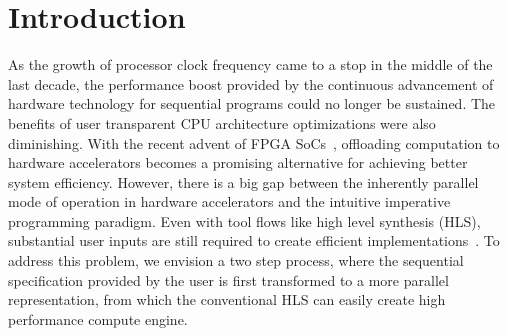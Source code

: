 \documentclass{sig-alternate}
\begin{document}



\section{Introduction}
As the growth of processor clock frequency came to a stop in the middle of the last decade, the performance boost provided by the continuous advancement of hardware technology for sequential programs could no longer be sustained. The benefits of user transparent CPU architecture optimizations were also diminishing. With the recent advent of FPGA SoCs~\cite{chips:zynq}, offloading computation to hardware accelerators becomes a promising alternative for
achieving better system efficiency. However,
there is a big gap between the inherently parallel mode of operation in hardware accelerators and the intuitive imperative programming paradigm. Even with tool flows like
high level synthesis (HLS), substantial user inputs are still required to create
efficient implementations~\cite{7082747}. To address this problem, we envision a two
step process, where the sequential specification provided by the user is first
transformed to a more parallel representation, from which the conventional HLS
can easily create high performance compute engine.

\end{document}

